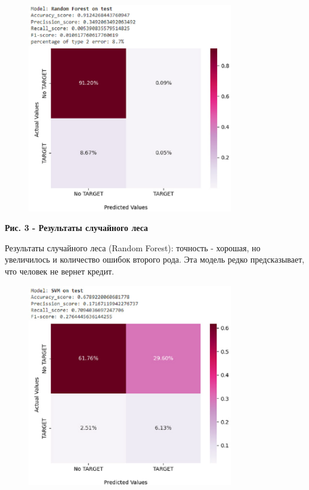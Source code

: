 \begin{figure}[H]
	\centering
	\includegraphics[width=0.8\textwidth]{assets/121}
	\caption*{}
\end{figure}

{\bfseries Рис. 3 - Результаты случайного леса}

Результаты случайного леса (Random Forest): точность - хорошая, но
увеличилось и количество ошибок второго рода. Эта модель редко
предсказывает, что человек не вернет кредит.

\begin{figure}[H]
	\centering
	\includegraphics[width=0.8\textwidth]{assets/122}
	\caption*{}
\end{figure}


